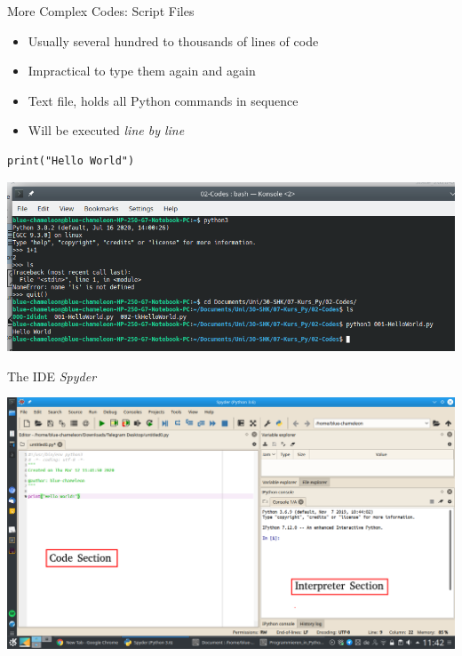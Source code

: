 \begin{frame}[fragile]{More Complex Codes: Script Files}
%
\begin{minipage}[t]{.29\linewidth}
\vspace{0pt}
\begin{itemize}
\item Usually several hundred to thousands of lines of code
\item Impractical to type them again and again
\item[\Thus] Text file, holds all Python commands in sequence
\item Will be executed \emph{line by line}
\end{itemize}
\end{minipage}
%
%
\begin{minipage}[t]{.69\linewidth}
\vspace{0pt}
\begin{codebox}
\begin{verbatim}
print("Hello World")
\end{verbatim}
\end{codebox}
\includegraphics[width=\linewidth]{./gfx/print-HelloWorld-Run}
\end{minipage}
%
\end{frame}


\begin{frame}[fragile]{The IDE \emph{Spyder}}
%
\begin{center}
\includegraphics[width=.8\linewidth]{./gfx/Spyder}
\end{center}
%
\end{frame}

